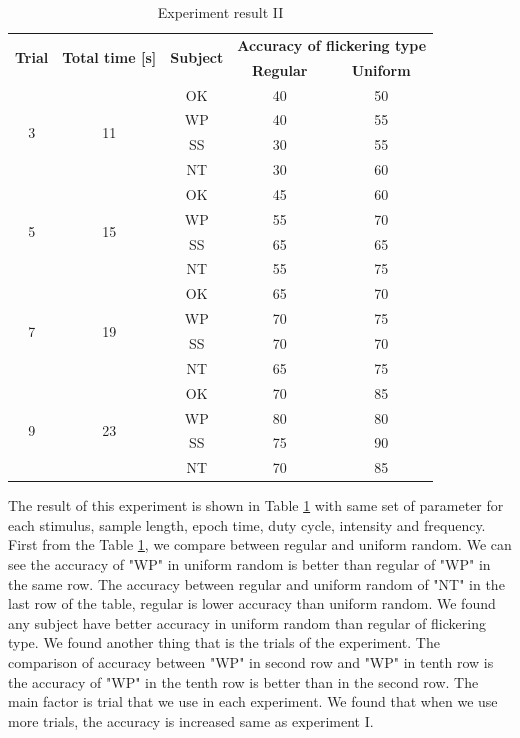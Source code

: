 \begin{table}[ht]
\centering
\begin{tabular}{| c | c | c | c | c |}

			\hline 
			\multirow{2}{*}{\textbf{Trial}} & 
  			\multirow{2}{*}{\textbf{Total time [s]}}  & 
            \multirow{2}{*}{\textbf{Subject}} &
            \multicolumn{2}{c|}{\textbf{Accuracy of flickering type}} \\
            \cline{4-5}
            &&&\multicolumn{1}{c|}{\textbf{Regular}} &\multicolumn{1}{c|}{\textbf{Uniform}}  \\
			\hline 
			\multirow{4}{*}{3}&\multirow{4}{*}{11}&OK&40&50 \\
			\cline{3-5}
			&&WP&40&55 \\ \cline{3-5}
			&&SS&30&55 \\ \cline{3-5}
			&&NT&30&60 \\
            \hline
			\multirow{4}{*}{5}&\multirow{4}{*}{15}&OK&45&60 \\
			\cline{3-5}
			&&WP&55&70 \\ \cline{3-5}
			&&SS&65&65 \\ \cline{3-5}
			&&NT&55&75 \\
            \hline
            \multirow{4}{*}{7}&\multirow{4}{*}{19}&OK&65&70 \\
			\cline{3-5}
			&&WP&70&75 \\ \cline{3-5}
			&&SS&70&70 \\ \cline{3-5}
			&&NT&65&75 \\
            \hline 
            \multirow{4}{*}{9}&\multirow{4}{*}{23}&OK&70&85 \\
			\cline{3-5}
			&&WP&80&80 \\ \cline{3-5}
			&&SS&75&90 \\ \cline{3-5}
			&&NT&70&85 \\
            \hline 
		\end{tabular}       
\caption{Experiment result II}
\label{table:result2}
\end{table}

The result of this experiment is shown in Table \ref{table:result2} with same set of parameter for each stimulus, sample length, epoch time, duty cycle, intensity and frequency. First from the Table \ref{table:result2}, we compare between regular and uniform random. We can see the accuracy of "WP" in uniform random is better than regular of "WP" in the same row. The accuracy between regular and uniform random of "NT" in the last row of the table, regular is lower accuracy than uniform random. We found any subject have better accuracy in uniform random than regular of flickering type. We found another thing that is the trials of the experiment. The comparison of accuracy between "WP" in second row and "WP" in tenth row is the accuracy of "WP" in the tenth row is better than in the second row. The main factor is trial that we use in each experiment. We found that when we use more trials, the accuracy is increased same as experiment I.

